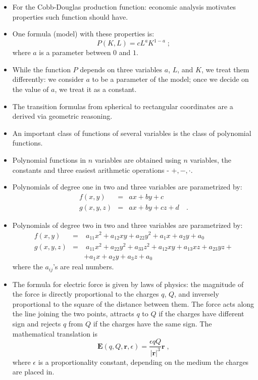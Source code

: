 \begin{frame}
\begin{itemize}
\item For the Cobb-Douglas production function: economic analysis motivates properties such function should have. 
\item<2-> One formula (model) with these properties is:
\[
P(K,L) = cL^a K^{1-a}\; ;
\]
where $a$ is a parameter between $0$ and $1$. 
\item<3-> While the function $P$ depends on three variables $a$, $L$, and $K$, we treat them differently: we consider $a$ to be a parameter of the model; once we decide on the value of $a$, we treat it as a constant.
\item<4-> The transition formulas from spherical to rectangular coordinates are a derived via geometric reasoning.
\end{itemize}
\end{frame}

\begin{frame}
\begin{itemize}
\item An important class of functions of several variables is the class of polynomial functions.
\item<2-> Polynomial functions in $n$ variables are obtained using $n$ variables, the constants and three easiest arithmetic operations - $+,-,\cdot $.
\item<3-> Polynomials of degree one in two and three variables are parametrized by:
\[
\begin{array}{rcl}
f(x,y) &= & ax+by+c \\
g(x,y,z)& = & ax+by+cz+d \quad .
\end{array}
\]
\item<4-> Polynomials of degree two in two and three variables are parametrized by:
\[
\begin{array}{rcl}
f(x,y) &= & \; a_{11}x^2+a_{12}xy+a_{22}y^2+ a_1 x + a_2 y + a_0 \\
g(x,y,z) &= & \; a_{11} x^2 + a_{22}y^2 + a_{33}z^2 + a_{12}xy + a_{13}xz+a_{23}yz + \\
&& + a_1 x + a_2 y + a_3 z + a_0
\end{array}
\]
where the $a_{ij}$'s are real numbers.
\end{itemize}
\end{frame}
\begin{frame}
\begin{itemize}
\item The formula for electric force is given by laws of physics: the magnitude of the force is directly proportional to the charges $q$, $Q$, and inversely proportional to the square of the distance between them. The force acts along the line joining the two points, attracts $q$ to $Q$ if the charges have different sign and rejects $q$ from $Q$ if the charges have the same sign. The mathematical translation is
\[
\textbf{E}(q, Q, \textbf{r}, \epsilon) = \frac{\epsilon q Q}{|\textbf{r}|^3} \textbf{r}\; ,
\]
where $\epsilon$ is a proportionality constant, depending on the medium the charges are placed in.
\end{itemize}
\end{frame}
